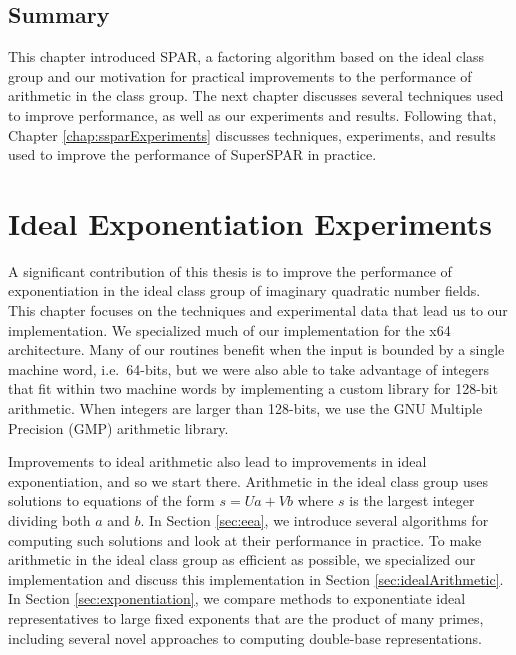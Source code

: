 \documentclass{ucalgthes1}
\theoremstyle{definition}
\begin{document}
\bigbreak
\section{Summary}

This chapter introduced SPAR, a factoring algorithm based on the ideal class group  and our motivation for practical improvements to the performance of arithmetic in the class group.  The next chapter discusses several techniques used to improve performance, as well as our experiments and results.  Following that, Chapter \ref{chap:ssparExperiments} discusses techniques, experiments, and results used to improve the performance of SuperSPAR in practice.

\chapter{Ideal Exponentiation Experiments}
\label{chap:idealPowExperiments}

A significant contribution of this thesis is to improve the performance of exponentiation in the ideal class group of imaginary quadratic number fields.  This chapter focuses on the techniques and experimental data that lead us to our implementation.  We specialized much of our implementation for the x64 architecture.  Many of our routines benefit when the input is bounded by a single machine word, i.e.\ 64-bits, but we were also able to take advantage of integers that fit within two machine words by implementing a custom library for 128-bit arithmetic.  When integers are larger than 128-bits, we use the GNU Multiple Precision (GMP) arithmetic library.

Improvements to ideal arithmetic also lead to improvements in ideal exponentiation, and so we start there. Arithmetic in the ideal class group uses solutions to equations of the form $s = Ua + Vb$ where $s$ is the largest integer dividing both $a$ and $b$. In Section \ref{sec:eea}, we introduce several algorithms for computing such solutions and look at their performance in practice. To make arithmetic in the ideal class group as efficient as possible, we specialized our implementation and discuss this implementation in Section \ref{sec:idealArithmetic}. In Section \ref{sec:exponentiation}, we compare methods to exponentiate ideal representatives to large fixed exponents that are the product of many primes, including several novel approaches to computing double-base representations.
\end{document}
